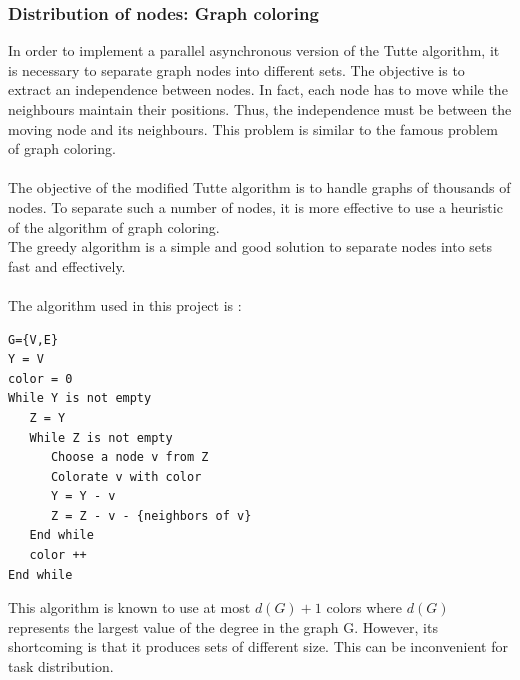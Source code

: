 \subsubsection{Distribution of nodes: Graph coloring}
In order to implement a parallel asynchronous version of the Tutte algorithm, it is necessary to separate graph nodes into different sets. The objective is to extract an independence between nodes. In fact, each node has to move while the neighbours maintain their positions. Thus, the independence must be between the moving node and its neighbours. This problem is similar to the famous problem of graph coloring.
\paragraph*{}
The objective of the modified Tutte algorithm is to handle graphs of thousands of nodes. To separate such a number of nodes, it is more effective to use a heuristic of the algorithm of graph coloring.\\
The greedy algorithm is a simple and good solution to separate nodes into sets fast and effectively.
\paragraph*{}
The algorithm used in this project is :
\begin{verbatim}
G={V,E}
Y = V
color = 0
While Y is not empty
   Z = Y
   While Z is not empty
      Choose a node v from Z
      Colorate v with color
      Y = Y - v
      Z = Z - v - {neighbors of v}
   End while
   color ++
End while
\end{verbatim}

This algorithm is known to use at most $d(G)+1$ colors where $d(G)$ represents the largest value of the degree in the graph G. However, its shortcoming is that it produces sets of different size. This can be inconvenient for task distribution.
